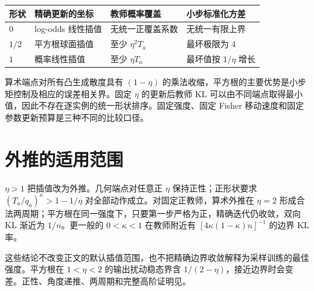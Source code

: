 \begin{center}
\begin{tabular}{lp{36mm}p{39mm}p{36mm}}
\toprule
形状 & 精确更新的坐标 & 教师概率覆盖 & 小步标准化方差\\
\midrule
$0$ & log-odds 线性插值 & 无统一正覆盖系数 & 无统一有限上界\\
$1/2$ & 平方根球面插值 & 至少 $\eta^2T_a$ & 最坏极限为 $4$\\
$1$ & 概率线性插值 & 至少 $\eta T_a$ & 最坏值按 $1/\eta$ 增长\\
\bottomrule
\end{tabular}
\end{center}

算术端点对所有凸生成散度具有 $(1-\eta)$ 的乘法收缩，平方根的主要优势是小步矩控制及相应的误差相关界。固定 $\eta$ 的更新后教师 KL 可以由不同端点取得最小值，因此不存在逐实例的统一形状排序。固定强度、固定 Fisher 移动速度和固定参数更新预算是三种不同的比较口径。

\section{外推的适用范围}
$\eta>1$ 把插值改为外推。几何端点对任意正 $\eta$ 保持正性；正形状要求 $(T_a/q_a)^\kappa>1-1/\eta$ 对全部动作成立。对固定正教师，算术外推在 $\eta=2$ 形成合法两周期；平方根在同一强度下，只要第一步严格为正，精确迭代仍收敛，双向 KL 渐近为 $1/n$。更一般的 $0<\kappa<1$ 在教师附近有 $[4\kappa(1-\kappa)n]^{-1}$ 的边界 KL 率。

这些结论不改变正文的默认插值范围，也不把精确边界收敛解释为采样训练的最佳强度。平方根在 $1<\eta<2$ 的输出扰动稳态界含 $1/(2-\eta)$，接近边界时会变差。正性、角度递推、两周期和完整高阶证明见。
